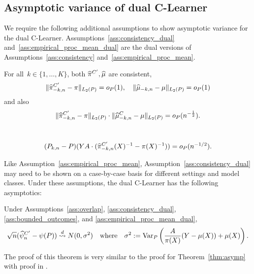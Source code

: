 \subsection{Asymptotic variance of dual C-Learner}
\label{sec:asymptotics_dual}
We require the following additional assumptions to show asymptotic variance for the dual C-Learner. Assumptions~\ref{ass:consistency_dual} and~\ref{ass:empirical_proc_mean_dual} are the dual versions of Assumptions~\ref{ass:consistency} and~\ref{ass:empirical_proc_mean}. 
\begin{assumption}
\label{ass:consistency_dual}
For all~$k \in \{1,\ldots,K\}$, 
both $\widehat{\pi}^{C'}, \widehat{\mu}$ are consistent,
    $$
    \|\widehat{\pi}^{C'}_{-k,n} - \pi\|_{L_2(P)}=o_P(1), \quad  \|\widehat{\mu}_{-k,n} - \mu\|_{L_2(P)}=o_P(1)
    $$ 
and also     $$    \|\widehat{\pi}^{C'}_{-k,n} - \pi\|_{L_2(P)} \cdot  \|\widehat{\mu}_{-k,n}^C - \mu\|_{L_2(P)}=o_P(n^{-\frac{1}{2}}).$$
\end{assumption}
\begin{assumption}%
\label{ass:empirical_proc_mean_dual}\
$$(P_{k,n}-P)(YA\cdot (  \widehat{\pi}_{-k,n}^{C'}(X)^{-1}- \pi(X)^{-1}) )=o_P(n^{-1/2}).$$
\end{assumption}
Like Assumption~\ref{ass:empirical_proc_mean}, Assumption~\ref{ass:consistency_dual} may need to be shown on a case-by-case basis for different settings and model classes. 
Under these assumptions,
the dual C-Learner has the following asymptotics:
\begin{theorem}
\label{thm:asymp_dual}
 Under Assumptions~\ref{ass:overlap}, \ref{ass:consistency_dual}, 
 \ref{ass:bounded_outcomes}, and
\ref{ass:empirical_proc_mean_dual},
 \begin{equation*}
    \sqrt{n} 
    (\widehat{\psi}_{n}^{C'} - \psi(P))
    \stackrel{d}{\rightsquigarrow} N(0, \sigma^2)~~~\mbox{where}~~~
    \sigma^2 := 
    {\rm Var}_P\left( \frac{A}{\pi(X)}(Y - \mu(X))
    +\mu(X)
    \right).
 \end{equation*}
\end{theorem}
The proof of this theorem is very similar to the proof for Theorem~\ref{thm:asymp} with proof in . %


